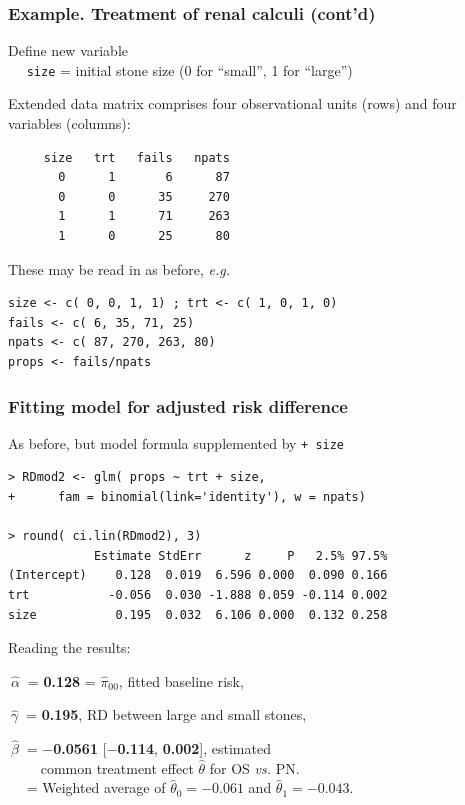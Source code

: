 \documentclass[handout,12pt]{beamer}
\begin{document}

\begin{frame}[fragile] \frametitle{Example. Treatment of renal calculi (cont'd)}

\bi
\item Define new variable\\ 
$\quad$ {\tt size} = initial stone size (0 for ``small'', 1 for ``large'')
\medskip
\item Extended data matrix comprises four observational units (rows) and four variables (columns):
\small
\begin{verbatim}
     size   trt   fails   npats
       0      1       6      87   
       0      0      35     270
       1      1      71     263 
       1      0      25      80  
\end{verbatim}
\normalsize
\medskip
\item These may be read in as before, {\it e.g.}
\small
\begin{verbatim}
size <- c( 0, 0, 1, 1) ; trt <- c( 1, 0, 1, 0)
fails <- c( 6, 35, 71, 25)
npats <- c( 87, 270, 263, 80) 
props <- fails/npats
\end{verbatim}
\normalsize
\ei
\end{frame} 


\begin{frame}[fragile] \frametitle{Fitting model for adjusted risk difference}
 
As before, but model formula supplemented by {\tt + size}
\small
\begin{verbatim}
> RDmod2 <- glm( props ~ trt + size, 
+      fam = binomial(link='identity'), w = npats)

> round( ci.lin(RDmod2), 3)
            Estimate StdErr      z     P   2.5% 97.5%
(Intercept)    0.128  0.019  6.596 0.000  0.090 0.166
trt           -0.056  0.030 -1.888 0.059 -0.114 0.002
size           0.195  0.032  6.106 0.000  0.132 0.258
\end{verbatim} 
\normalsize
Reading the results:
\bi
\item[ ]$\ \widehat\alpha\ $ = {\bf 0.128} = $\widehat\pi_{00}$, fitted baseline risk,
\item[ ]$\ \widehat\gamma\ $ = {\bf 0.195}, RD between large and small stones,
\item[ ]$\ \widehat\beta\ $ = $-${\bf 0.0561} [$-${\bf 0.114},
 {\bf 0.002}], estimated \\ $\qquad$ common
  treatment effect $\widehat \theta$ for OS {\it vs.} PN.\\
$\quad$ = Weighted average of $\widehat \theta_0 = -0.061$ and $\widehat \theta_1 = -0.043$.
\ei

\end{frame} 
\end{document}
